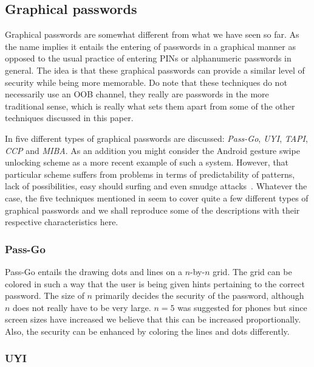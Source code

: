 \documentclass[conference, 11pt]{sty/IEEEtran}
\begin{document}
\subsection{Graphical passwords}
\label{ssec:graphical_passwords}

Graphical passwords are somewhat different from what we have seen so far.
As the name implies it entails the entering of passwords in a graphical manner as opposed to the usual practice of entering PINs or alphanumeric passwords in general.
The idea is that these graphical passwords can provide a similar level of security while being more memorable.
Do note that these techniques do not necessarily use an OOB channel, they really are passwords in the more traditional sense, which is really what sets them apart from some of the other techniques discussed in this paper.

In \cite{gajos2006exploring} five different types of graphical passwords are discussed: \emph{Pass-Go}, \emph{UYI}, \emph{TAPI}, \emph{CCP} and \emph{MIBA}.
As an addition you might consider the Android gesture swipe unlocking scheme as a more recent example of such a system.
However, that particular scheme suffers from problems in terms of predictability of patterns, lack of possibilities, easy should surfing and even smudge attacks~\cite{aviv2010smudge}.
Whatever the case, the five techniques mentioned in \cite{gajos2006exploring} seem to cover quite a few different types of graphical passwords and we shall reproduce some of the descriptions with their respective characteristics here.

\subsubsection{Pass-Go}
\label{sssec:pass_go}

Pass-Go entails the drawing dots and lines on a $n$-by-$n$ grid.
The grid can be colored in such a way that the user is being given hints pertaining to the correct password.
The size of $n$ primarily decides the security of the password, although $n$ does not really have to be very large.
$n = 5$ was suggested for phones but since screen sizes have increased we believe that this can be increased proportionally.
Also, the security can be enhanced by coloring the lines and dots differently.

\subsubsection{UYI}
\label{sssec:uyi}
\end{document}

